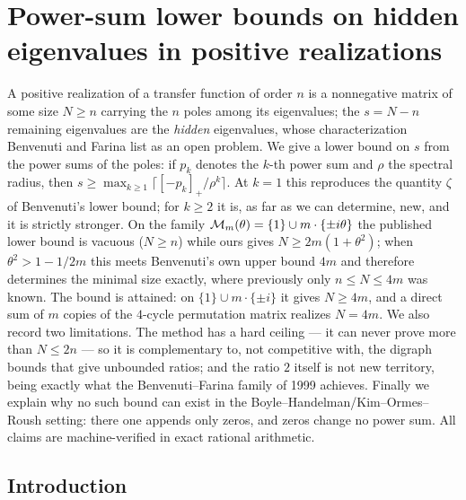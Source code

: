\chapter[Power-sum lower bounds on hidden eigenvalues in positive realizations]{Power-sum lower bounds on hidden eigenvalues in positive realizations}\label{chap:Ctrl1}
\begin{chapterabstract}
\noindent
A positive realization of a transfer function of order $n$ is a nonnegative matrix of some
size $N\ge n$ carrying the $n$ poles among its eigenvalues; the $s=N-n$ remaining
eigenvalues are the \emph{hidden} eigenvalues, whose characterization Benvenuti and Farina
list as an open problem. We give a lower bound on $s$ from the power sums of the poles: if
$p_k$ denotes the $k$-th power sum and $\rho$ the spectral radius, then
$s\ge\max_{k\ge1}\lceil[-p_k]_+/\rho^k\rceil$. At $k=1$ this reproduces the quantity
$\zeta$ of Benvenuti's lower bound; for $k\ge2$ it is, as far as we can determine, new, and
it is strictly stronger. On the family $\mathcal{M}_m(\theta)=\{1\}\cup m\cdot\{\pm i\theta\}$ the
published lower bound is vacuous ($N\ge n$) while ours gives $N\ge 2m(1+\theta^{2})$; when
$\theta^{2}>1-1/2m$ this meets Benvenuti's own upper bound $4m$ and therefore determines
the minimal size exactly, where previously only $n\le N\le 4m$ was known. The bound is
attained: on $\{1\}\cup m\cdot\{\pm i\}$ it gives $N\ge4m$, and a direct sum of $m$ copies
of the $4$-cycle permutation matrix realizes $N=4m$. We also record two limitations. The
method has a hard ceiling --- it can never prove more than $N\le2n$ --- so it is
complementary to, not competitive with, the digraph bounds that give unbounded ratios; and
the ratio $2$ itself is not new territory, being exactly what the Benvenuti--Farina family
of 1999 achieves. Finally we explain why no such bound can exist in the
Boyle--Handelman/Kim--Ormes--Roush setting: there one appends only zeros, and zeros change
no power sum. All claims are machine-verified in exact rational arithmetic.
\end{chapterabstract}

\section{Introduction}\label{Ctrl1:sec:intro}

